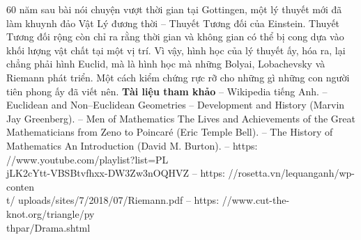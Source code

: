 \begin{multicols}{2}
	\vskip 0.1cm
	$60$ năm sau bài nói chuyện vượt thời gian tại Gottingen, một lý thuyết mới đã làm khuynh đảo Vật Lý đương thời -- Thuyết Tương đối của Einstein. Thuyết Tương đối rộng còn chỉ ra rằng thời gian và không gian có thể bị cong dựa vào khối lượng vật chất tại một vị trí. Vì vậy, hình học của lý thuyết ấy, hóa ra, lại chẳng phải hình Euclid, mà là hình học mà những Bolyai, Lobachevsky và Riemann phát triển. Một cách kiểm chứng rực rỡ cho những gì những con người tiên phong ấy đã viết nên.
	\vskip 0.1cm
	\textbf{\color{lichsutoanhoc}\color{lichsutoanhoc}Tài liệu tham khảo}
	\vskip 0.1cm
	-- Wikipedia tiếng Anh.
	\vskip 0.1cm
	-- Euclidean and Non--Euclidean Geometries -- Development and History (Marvin Jay Greenberg).
	\vskip 0.1cm
	-- Men of Mathematics The Lives and Achievements of the Great Mathematicians from Zeno to Poincaré (Eric Temple Bell).
	\vskip 0.1cm
	-- The History of Mathematics An Introduction (David M. Burton).
	\vskip 0.1cm
	-- https: //www.youtube.com/playlist?list=PL\\jLK2cYtt-VBSBtvfhxx-DW3Zw3nOQHVZ
	\vskip 0.1cm
	-- https: //rosetta.vn/lequanganh/wp-conten\\t/
	uploads/sites/7/2018/07/Riemann.pdf
	\vskip 0.1cm
	-- https: //www.cut-the-knot.org/triangle/py\\
	thpar/Drama.shtml
\end{multicols}